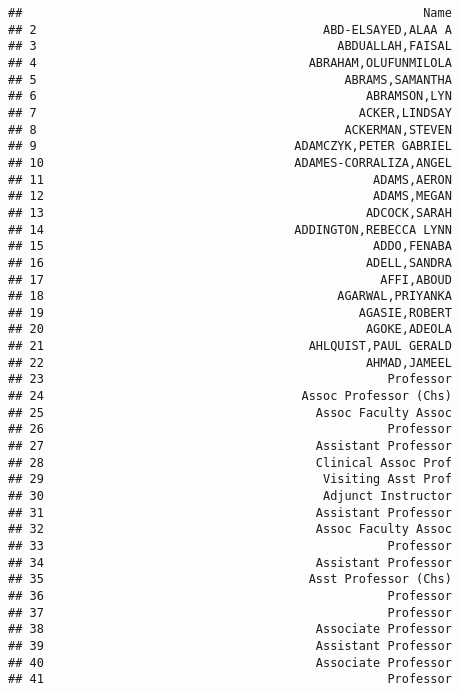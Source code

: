 \documentclass[
]{article}
\begin{document}
\begin{verbatim}
##                                                        Name
## 2                                        ABD-ELSAYED,ALAA A
## 3                                          ABDUALLAH,FAISAL
## 4                                      ABRAHAM,OLUFUNMILOLA
## 5                                           ABRAMS,SAMANTHA
## 6                                              ABRAMSON,LYN
## 7                                             ACKER,LINDSAY
## 8                                           ACKERMAN,STEVEN
## 9                                    ADAMCZYK,PETER GABRIEL
## 10                                   ADAMES-CORRALIZA,ANGEL
## 11                                              ADAMS,AERON
## 12                                              ADAMS,MEGAN
## 13                                             ADCOCK,SARAH
## 14                                   ADDINGTON,REBECCA LYNN
## 15                                              ADDO,FENABA
## 16                                             ADELL,SANDRA
## 17                                               AFFI,ABOUD
## 18                                         AGARWAL,PRIYANKA
## 19                                            AGASIE,ROBERT
## 20                                             AGOKE,ADEOLA
## 21                                     AHLQUIST,PAUL GERALD
## 22                                             AHMAD,JAMEEL
## 23                                                Professor
## 24                                    Assoc Professor (Chs)
## 25                                      Assoc Faculty Assoc
## 26                                                Professor
## 27                                      Assistant Professor
## 28                                      Clinical Assoc Prof
## 29                                       Visiting Asst Prof
## 30                                       Adjunct Instructor
## 31                                      Assistant Professor
## 32                                      Assoc Faculty Assoc
## 33                                                Professor
## 34                                      Assistant Professor
## 35                                     Asst Professor (Chs)
## 36                                                Professor
## 37                                                Professor
## 38                                      Associate Professor
## 39                                      Assistant Professor
## 40                                      Associate Professor
## 41                                                Professor

\end{verbatim}
\end{document}

